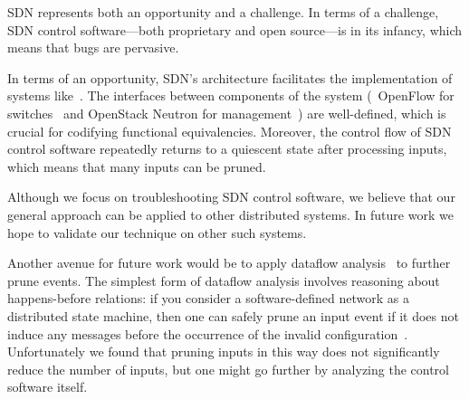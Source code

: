  SDN represents both an
opportunity and a challenge. In terms of a challenge,
SDN control software---both proprietary and open source---is in its infancy, which means
that bugs are pervasive.

In terms of an opportunity, SDN's architecture facilitates the implementation
of systems like~\projectname. The
interfaces between components of the system
(\eg~OpenFlow for switches~\cite{openflow} and OpenStack
Neutron for management~\cite{quantum}) are well-defined, which is
crucial for codifying functional equivalencies. %
Moreover, the control flow of SDN control software repeatedly returns to
a quiescent state after processing inputs, which means that many inputs can be pruned.


Although we focus on
troubleshooting SDN control software, we believe that our general approach can
be applied to other distributed systems.
In future work we hope to validate our
technique on other such systems. %

 Another avenue for future work would be to apply
dataflow
analysis~\cite{Lee:2011:TGR:1993498.1993528,tallam2007enabling}
to further prune events.
The simplest form of dataflow analysis involves
reasoning about happens-before relations: if you consider a
software-defined network as a distributed state machine,
then one can safely prune an input event if
it does not induce any messages before
the occurrence of the invalid
configuration~\cite{Lamport:1978:TCO:359545.359563}.
Unfortunately we found that pruning inputs in this way does not
significantly reduce the number of inputs, but one might go further by
analyzing the control software itself.

